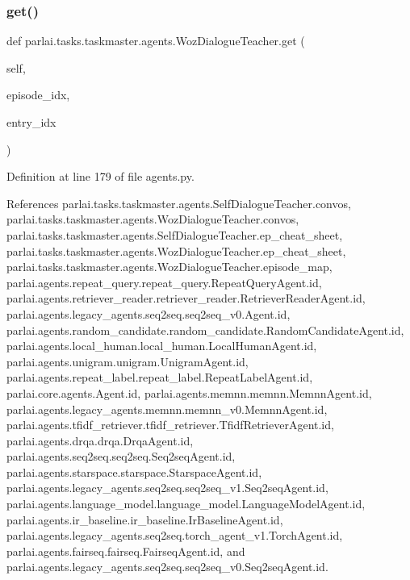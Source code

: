 \mbox{\label{classparlai_1_1tasks_1_1taskmaster_1_1agents_1_1WozDialogueTeacher_a982f56ed9a06f08ecf0c5392f0cb9c0b}} 
\subsubsection{\texorpdfstring{get()}{get()}}
{\footnotesize\ttfamily def parlai.\+tasks.\+taskmaster.\+agents.\+Woz\+Dialogue\+Teacher.\+get (\begin{DoxyParamCaption}\item[{}]{self,  }\item[{}]{episode\+\_\+idx,  }\item[{}]{entry\+\_\+idx }\end{DoxyParamCaption})}



Definition at line 179 of file agents.\+py.



References parlai.\+tasks.\+taskmaster.\+agents.\+Self\+Dialogue\+Teacher.\+convos, parlai.\+tasks.\+taskmaster.\+agents.\+Woz\+Dialogue\+Teacher.\+convos, parlai.\+tasks.\+taskmaster.\+agents.\+Self\+Dialogue\+Teacher.\+ep\+\_\+cheat\+\_\+sheet, parlai.\+tasks.\+taskmaster.\+agents.\+Woz\+Dialogue\+Teacher.\+ep\+\_\+cheat\+\_\+sheet, parlai.\+tasks.\+taskmaster.\+agents.\+Woz\+Dialogue\+Teacher.\+episode\+\_\+map, parlai.\+agents.\+repeat\+\_\+query.\+repeat\+\_\+query.\+Repeat\+Query\+Agent.\+id, parlai.\+agents.\+retriever\+\_\+reader.\+retriever\+\_\+reader.\+Retriever\+Reader\+Agent.\+id, parlai.\+agents.\+legacy\+\_\+agents.\+seq2seq.\+seq2seq\+\_\+v0.\+Agent.\+id, parlai.\+agents.\+random\+\_\+candidate.\+random\+\_\+candidate.\+Random\+Candidate\+Agent.\+id, parlai.\+agents.\+local\+\_\+human.\+local\+\_\+human.\+Local\+Human\+Agent.\+id, parlai.\+agents.\+unigram.\+unigram.\+Unigram\+Agent.\+id, parlai.\+agents.\+repeat\+\_\+label.\+repeat\+\_\+label.\+Repeat\+Label\+Agent.\+id, parlai.\+core.\+agents.\+Agent.\+id, parlai.\+agents.\+memnn.\+memnn.\+Memnn\+Agent.\+id, parlai.\+agents.\+legacy\+\_\+agents.\+memnn.\+memnn\+\_\+v0.\+Memnn\+Agent.\+id, parlai.\+agents.\+tfidf\+\_\+retriever.\+tfidf\+\_\+retriever.\+Tfidf\+Retriever\+Agent.\+id, parlai.\+agents.\+drqa.\+drqa.\+Drqa\+Agent.\+id, parlai.\+agents.\+seq2seq.\+seq2seq.\+Seq2seq\+Agent.\+id, parlai.\+agents.\+starspace.\+starspace.\+Starspace\+Agent.\+id, parlai.\+agents.\+legacy\+\_\+agents.\+seq2seq.\+seq2seq\+\_\+v1.\+Seq2seq\+Agent.\+id, parlai.\+agents.\+language\+\_\+model.\+language\+\_\+model.\+Language\+Model\+Agent.\+id, parlai.\+agents.\+ir\+\_\+baseline.\+ir\+\_\+baseline.\+Ir\+Baseline\+Agent.\+id, parlai.\+agents.\+legacy\+\_\+agents.\+seq2seq.\+torch\+\_\+agent\+\_\+v1.\+Torch\+Agent.\+id, parlai.\+agents.\+fairseq.\+fairseq.\+Fairseq\+Agent.\+id, and parlai.\+agents.\+legacy\+\_\+agents.\+seq2seq.\+seq2seq\+\_\+v0.\+Seq2seq\+Agent.\+id.

